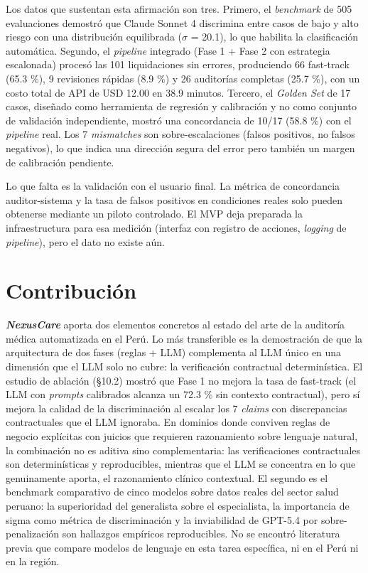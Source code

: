 Los datos que sustentan esta afirmación son tres. Primero, el \textit{benchmark} de 505 evaluaciones demostró que Claude Sonnet 4 discrimina entre casos de bajo y alto riesgo con una distribución equilibrada ($\sigma$ = 20.1), lo que habilita la clasificación automática. Segundo, el \textit{pipeline} integrado (Fase 1 + Fase 2 con estrategia escalonada) procesó las 101 liquidaciones sin errores, produciendo 66 fast-track (65.3 \%), 9 revisiones rápidas (8.9 \%) y 26 auditorías completas (25.7 \%), con un costo total de API de USD 12.00 en 38.9 minutos. Tercero, el \textit{Golden Set} de 17 casos, diseñado como herramienta de regresión y calibración y no como conjunto de validación independiente, mostró una concordancia de 10/17 (58.8 \%) con el \textit{pipeline} real. Los 7 \textit{mismatches} son sobre-escalaciones (falsos positivos, no falsos negativos), lo que indica una dirección segura del error pero también un margen de calibración pendiente.

Lo que falta es la validación con el usuario final. La métrica de concordancia auditor-sistema y la tasa de falsos positivos en condiciones reales solo pueden obtenerse mediante un piloto controlado. El MVP deja preparada la infraestructura para esa medición (interfaz con registro de acciones, \textit{logging} de \textit{pipeline}), pero el dato no existe aún.

\section{Contribución}

\textbf{\textit{NexusCare}} aporta dos elementos concretos al estado del arte de la auditoría médica automatizada en el Perú. Lo más transferible es la demostración de que la arquitectura de dos fases (reglas + LLM) complementa al LLM único en una dimensión que el LLM solo no cubre: la verificación contractual determinística. El estudio de ablación (§10.2) mostró que Fase 1 no mejora la tasa de fast-track (el LLM con \textit{prompts} calibrados alcanza un 72.3 \% sin contexto contractual), pero sí mejora la calidad de la discriminación al escalar los 7 \textit{claims} con discrepancias contractuales que el LLM ignoraba. En dominios donde conviven reglas de negocio explícitas con juicios que requieren razonamiento sobre lenguaje natural, la combinación no es aditiva sino complementaria: las verificaciones contractuales son determinísticas y reproducibles, mientras que el LLM se concentra en lo que genuinamente aporta, el razonamiento clínico contextual. El segundo es el benchmark comparativo de cinco modelos sobre datos reales del sector salud peruano: la superioridad del generalista sobre el especialista, la importancia de sigma como métrica de discriminación y la inviabilidad de GPT-5.4 por sobre-penalización son hallazgos empíricos reproducibles. No se encontró literatura previa que compare modelos de lenguaje en esta tarea específica, ni en el Perú ni en la región.

